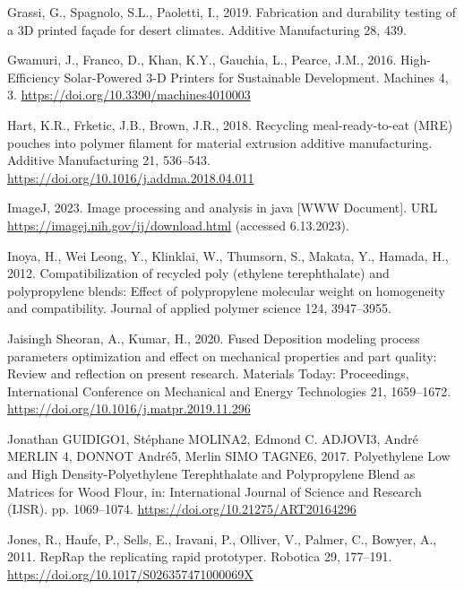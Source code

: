 \documentclass[
  12pt,
  number,
  review]{elsarticle}
\newlength{\cslhangindent}
\newlength{\cslentryspacingunit} %
\newenvironment{CSLReferences}[2] %
 {%
  \setlength{\parindent}{0pt}
  \ifodd #1
  \let\oldpar\par
  \def\par{\hangindent=\cslhangindent\oldpar}
  \fi
  \setlength{\parskip}{#2\cslentryspacingunit}
 }%
 {}
\begin{document}
\begin{CSLReferences}{1}{0}
\leavevmode{}%
Grassi, G., Spagnolo, S.L., Paoletti, I., 2019. Fabrication and
durability testing of a {3D} printed façade for desert climates.
Additive Manufacturing 28, 439.

\leavevmode{}%
Gwamuri, J., Franco, D., Khan, K.Y., Gauchia, L., Pearce, J.M., 2016.
High-{Efficiency Solar-Powered} 3-{D Printers} for {Sustainable
Development}. Machines 4, 3.
\url{https://doi.org/10.3390/machines4010003}

\leavevmode{}%
Hart, K.R., Frketic, J.B., Brown, J.R., 2018. Recycling
meal-ready-to-eat ({MRE}) pouches into polymer filament for material
extrusion additive manufacturing. Additive Manufacturing 21, 536--543.
\url{https://doi.org/10.1016/j.addma.2018.04.011}

\leavevmode{}%
ImageJ, 2023. Image processing and analysis in java {[}WWW Document{]}.
URL \url{https://imagej.nih.gov/ij/download.html} (accessed 6.13.2023).

\leavevmode{}%
Inoya, H., Wei Leong, Y., Klinklai, W., Thumsorn, S., Makata, Y.,
Hamada, H., 2012. Compatibilization of recycled poly (ethylene
terephthalate) and polypropylene blends: Effect of polypropylene
molecular weight on homogeneity and compatibility. Journal of applied
polymer science 124, 3947--3955.

\leavevmode{}%
Jaisingh Sheoran, A., Kumar, H., 2020. Fused {Deposition} modeling
process parameters optimization and effect on mechanical properties and
part quality: {Review} and reflection on present research. Materials
Today: Proceedings, International {Conference} on {Mechanical} and
{Energy Technologies} 21, 1659--1672.
\url{https://doi.org/10.1016/j.matpr.2019.11.296}

\leavevmode{}%
Jonathan GUIDIGO1, Stéphane MOLINA2, Edmond C. ADJOVI3, André MERLIN 4,
DONNOT André5, Merlin SIMO TAGNE6, 2017. Polyethylene {Low} and {High
Density-Polyethylene Terephthalate} and {Polypropylene Blend} as
{Matrices} for {Wood Flour}, in: International {Journal} of {Science}
and {Research} ({IJSR}). pp. 1069--1074.
\url{https://doi.org/10.21275/ART20164296}

\leavevmode{}%
Jones, R., Haufe, P., Sells, E., Iravani, P., Olliver, V., Palmer, C.,
Bowyer, A., 2011. {RepRap} \textendash{} the replicating rapid
prototyper. Robotica 29, 177--191.
\url{https://doi.org/10.1017/S026357471000069X}


\end{CSLReferences}
\end{document}
